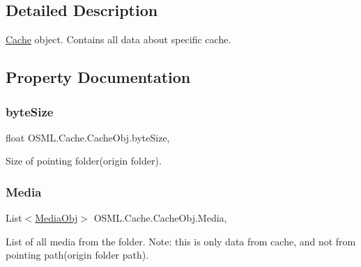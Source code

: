 \subsection{Detailed Description}
\mbox{\hyperlink{namespaceOSML_1_1Cache}{Cache}} object. Contains all data about specific cache. 



\subsection{Property Documentation}
\mbox{\label{classOSML_1_1Cache_1_1CacheObj_ab5679dce3f7647572c4e3b84bd35efb8}} 
\subsubsection{\texorpdfstring{byteSize}{byteSize}}
{\footnotesize\ttfamily float O\+S\+M\+L.\+Cache.\+Cache\+Obj.\+byte\+Size\hspace{0.3cm}{\ttfamily [get]}, {\ttfamily [set]}}



Size of pointing folder(origin folder). 

\mbox{\label{classOSML_1_1Cache_1_1CacheObj_afd71e5729f4e76e9efb5f97da8c0f0ad}} 
\subsubsection{\texorpdfstring{Media}{Media}}
{\footnotesize\ttfamily List$<$\mbox{\hyperlink{classOSML_1_1Media_1_1MediaObj}{Media\+Obj}}$>$ O\+S\+M\+L.\+Cache.\+Cache\+Obj.\+Media\hspace{0.3cm}{\ttfamily [get]}, {\ttfamily [set]}}



List of all media from the folder. Note\+: this is only data from cache, and not from pointing path(origin folder path). 

\mbox{\label{classOSML_1_1Cache_1_1CacheObj_af06e3c3cfcffbd3d602f4eedf3ba08fa}} 

